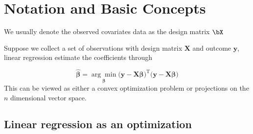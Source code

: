 \documentclass[
]{book}
\begin{document}
\hypertarget{notation-and-basic-concepts}{%
\section{Notation and Basic Concepts}\label{notation-and-basic-concepts}}

We usually denote the observed covariates data as the design matrix \(\bX\)

Suppose we collect a set of observations with design matrix \(\mathbf{X}\) and outcome \(\mathbf{y}\), linear regression estimate the coefficients through

\[ \widehat{\boldsymbol \beta} = \underset{\boldsymbol \beta}{\arg\min} \big( \mathbf y - \mathbf{X} \boldsymbol \beta \big)^\text{T} \big( \mathbf y - \mathbf{X} \boldsymbol \beta \big) \]
This can be viewed as either a convex optimization problem or projections on the \(n\) dimensional vector space.

\hypertarget{linear-regression-as-an-optimization}{%
\subsection{Linear regression as an optimization}\label{linear-regression-as-an-optimization}}
\end{document}
